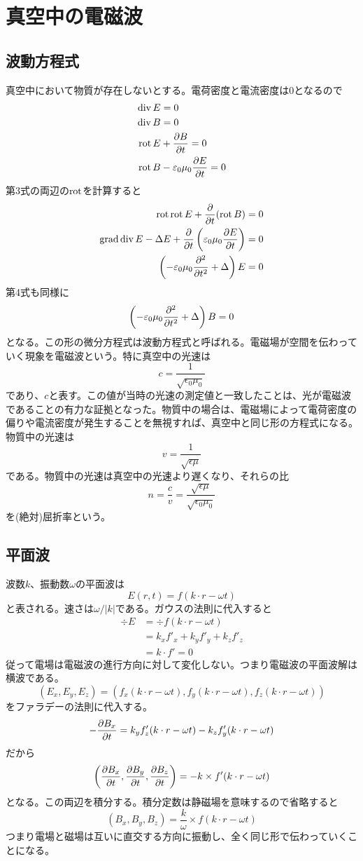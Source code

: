 \section{真空中の電磁波}

\subsection{波動方程式}
    真空中において物質が存在しないとする。電荷密度と電流密度は0となるので
    \begin{align*}
        \div E &= 0\\
        \div B &= 0\\
        \rot E &+ \pd[B]{t} = 0\\
        \rot B &- \epsilon_0\mu_0\pd[E]{t} = 0
    \end{align*}
    第3式の両辺の$\rot$を計算すると
    \begin{align*}
        \rot\rot E + \pd{t}(\rot B) &= 0\\
        \grad\div E - \Delta E + \pd{t}\left(\epsilon_0\mu_0\pd[E]{t}\right) &= 0\\
        \left(-\epsilon_0\mu_0\pdd{t} + \Delta\right)E &= 0
    \end{align*}
    第4式も同様に
        \[\left(-\epsilon_0\mu_0\pdd{t} + \Delta\right)B = 0\]
    となる。この形の微分方程式は波動方程式と呼ばれる。電磁場が空間を伝わっていく現象を電磁波という。特に真空中の光速は
        \[c = \frac{1}{\sqrt{\epsilon_0\mu_0}}\]
    であり、$c$と表す。この値が当時の光速の測定値と一致したことは、光が電磁波であることの有力な証拠となった。物質中の場合は、電磁場によって電荷密度の偏りや電流密度が発生することを無視すれば、真空中と同じ形の方程式になる。物質中の光速は
        \[v = \frac{1}{\sqrt{\epsilon\mu}}\]
    である。物質中の光速は真空中の光速より遅くなり、それらの比
        \[n = \frac{c}{v} = \frac{\sqrt{\epsilon\mu}}{\sqrt{\epsilon_0\mu_0}}\]
    を(絶対)屈折率という。

\subsection{平面波}
    波数$k$、振動数$\omega$の平面波は
        \[E(r, t) = f(k \cdot r - \omega t)\]
    と表される。速さは$\omega / |k|$である。ガウスの法則に代入すると
    \begin{align*}
        \div E
        &= \div f(k \cdot r - \omega t)\\
        &= k_xf'_x + k_yf'_y + k_zf'_z\\
        &= k \cdot f' = 0
    \end{align*}
    従って電場は電磁波の進行方向に対して変化しない。つまり電磁波の平面波解は横波である。
        \[(E_x, E_y, E_z) = (f_x(k \cdot r - \omega t), f_y(k \cdot r - \omega t), f_z(k \cdot r - \omega t))\]
    をファラデーの法則に代入する。
        \[-\pd[B_x]{t} = k_yf_z'(k \cdot r - \omega t) - k_zf_y'(k \cdot r - \omega t)\]
    だから
        \[\left(\pd[B_x]{t}, \pd[B_y]{t}, \pd[B_z]{t}\right) = -k \times f'(k \cdot r - \omega t)\]
    となる。この両辺を積分する。積分定数は静磁場を意味するので省略すると
        \[(B_x, B_y, B_z) = \frac{k}{\omega} \times f(k \cdot r - \omega t)\]
    つまり電場と磁場は互いに直交する方向に振動し、全く同じ形で伝わっていくことになる。

